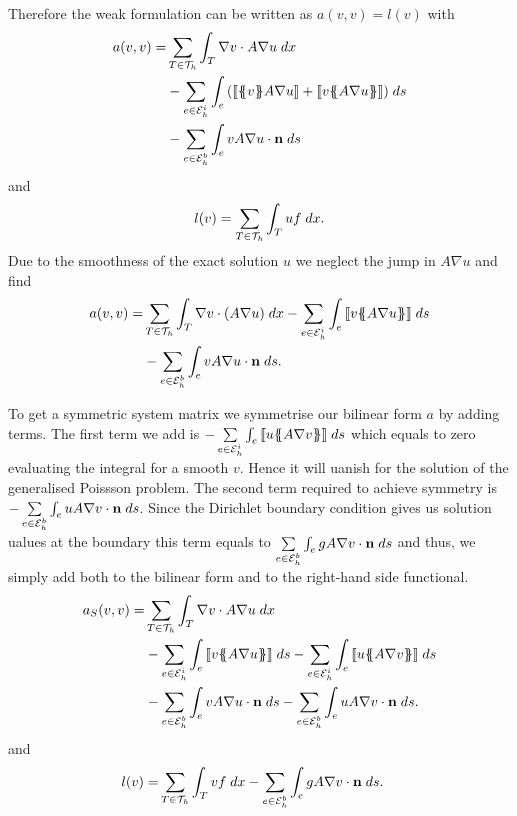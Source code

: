 Therefore the weak formulation can be written as $a(v,v) = l(v)$ with 
\begin{align*}
  a(v, v) = & \sum\limits_{T \in \triang} \myIntX  T { \nabla v \cdot A \nabla u} \\
	& - \sum\limits_{e \in \edgesi}\myIntS {e} {\left( \jump {\average v A \nabla u} + \jump {v \average{ A \nabla u}} \right)}\\
& - \sum\limits_{e \in \edgesb}\myIntS {e} {v A \nabla u \cdot \mathbf n}
\end{align*}
and
\[
l(v) = \sum_{T \in \mathcal{T}_h} \int_{T} {{ u f}\;dx}.
\]
Due to the smoothness of the exact solution $u$ we neglect the jump in $A \nabla u$ and find
\begin{align*}
 a(v, v) = & \sum\limits_{T \in \triang} \myIntX  T { \nabla v \cdot \left(A \nabla u\right)} %
	- \sum\limits_{e \in \edgesi} \myIntS e {\jump{ v \average{ A \nabla u}}} %
	\\
& - \sum\limits_{e \in \edgesb}\myIntS e { v A \nabla u \cdot \mathbf n}.
\end{align*}

To get a symmetric system matrix we symmetrise our bilinear form $a$ by adding terms. 
The first term we add is  $- \sum\limits_{e \in \mathcal{E}_h^i}\int_{e} {{ \llbracket  u \{\!\!\{  A \nabla v \}\!\!\} \rrbracket}\;ds}$ which equals to zero evaluating the integral for a smooth $v$. Hence it will uanish for the solution of the generalised Poissson problem. The second term required to achieve symmetry is  $-\sum\limits_{e \in \mathcal{E}_h^b}\int_{e} {{ u A \nabla v \cdot \mathbf n}\;ds}$. Since the Dirichlet boundary condition gives us solution ualues at the boundary this term equals to $\sum\limits_{e \in \mathcal{E}_h^b}\int_{e} {{ g A \nabla v \cdot \mathbf n}\;ds}$ and thus, we simply add both to the bilinear form and to the right-hand side functional.
\begin{align}
 a_S(v, v) = &\sum\limits_{T \in \triang} \myIntX  T { \nabla v \cdot A \nabla u} \nonumber \\
  &-\sum\limits_{e \in \edgesi}\myIntS e { \jump {v \average{A \nabla u} }}
 - \sum\limits_{e \in \edgesi}\myIntS e { \jump{ u \average{ A \nabla v}}} \nonumber\\ 
 & - \sum\limits_{e \in \edgesb}\myIntS e { v A \nabla u \cdot \mathbf n} 
    - \sum\limits_{e \in \edgesb}\myIntS e { u A \nabla v \cdot \mathbf n}. \label{eq:inner product SIPG}
\end{align}
and 
\begin{align}
	l(v) =& \sum\limits_{T \in \mathcal{T}_h} \int_{T} {{ v f}\;dx}
		 -\sum\limits_{e \in \mathcal{E}_h^b}\int_{e} {{ g A \nabla v \cdot \mathbf n}\;ds}.
\end{align} 

